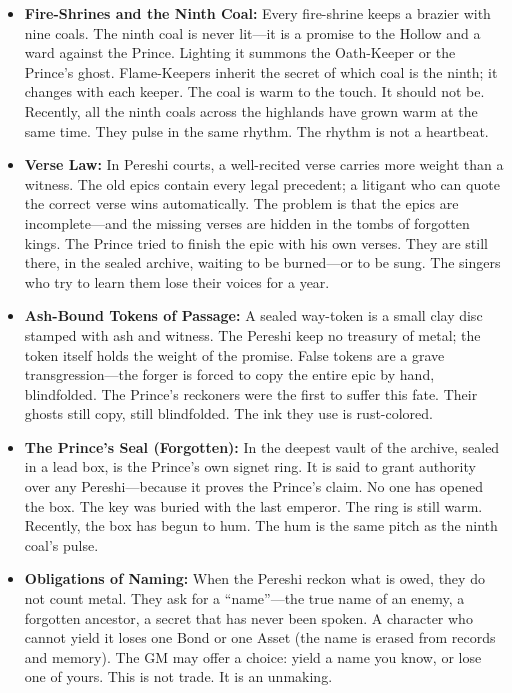 \begin{itemize}
\item \textbf{Fire-Shrines and the Ninth Coal:} Every fire-shrine keeps a brazier with nine coals. The ninth coal is never lit---it is a promise to the Hollow and a ward against the Prince. Lighting it summons the Oath-Keeper or the Prince's ghost. Flame-Keepers inherit the secret of which coal is the ninth; it changes with each keeper. The coal is warm to the touch. It should not be. Recently, all the ninth coals across the highlands have grown warm at the same time. They pulse in the same rhythm. The rhythm is not a heartbeat.
\item \textbf{Verse Law:} In Pereshi courts, a well-recited verse carries more weight than a witness. The old epics contain every legal precedent; a litigant who can quote the correct verse wins automatically. The problem is that the epics are incomplete---and the missing verses are hidden in the tombs of forgotten kings. The Prince tried to finish the epic with his own verses. They are still there, in the sealed archive, waiting to be burned---or to be sung. The singers who try to learn them lose their voices for a year.
\item \textbf{Ash-Bound Tokens of Passage:} A sealed way-token is a small clay disc stamped with ash and witness. The Pereshi keep no treasury of metal; the token itself holds the weight of the promise. False tokens are a grave transgression---the forger is forced to copy the entire epic by hand, blindfolded. The Prince's reckoners were the first to suffer this fate. Their ghosts still copy, still blindfolded. The ink they use is rust-colored.
\item \textbf{The Prince's Seal (Forgotten):} In the deepest vault of the archive, sealed in a lead box, is the Prince's own signet ring. It is said to grant authority over any Pereshi---because it proves the Prince's claim. No one has opened the box. The key was buried with the last emperor. The ring is still warm. Recently, the box has begun to hum. The hum is the same pitch as the ninth coal's pulse.
\item \textbf{Obligations of Naming:} When the Pereshi reckon what is owed, they do not count metal. They ask for a ``name''---the true name of an enemy, a forgotten ancestor, a secret that has never been spoken. A character who cannot yield it loses one Bond or one Asset (the name is erased from records and memory). The GM may offer a choice: yield a name you know, or lose one of yours. This is not trade. It is an unmaking.

\end{itemize}
